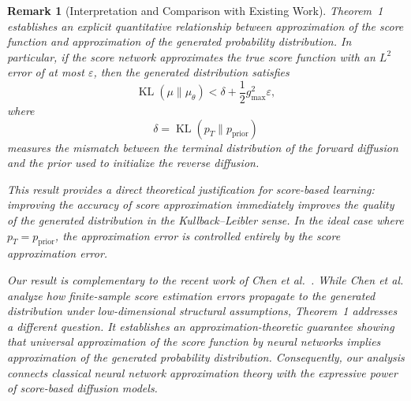 \documentclass[11pt]{article}
\newtheorem{remark}{Remark}
\DeclareMathOperator{\KL}{KL}
\begin{document}
\begin{remark}[Interpretation and Comparison with Existing Work]

Theorem~1 establishes an explicit quantitative relationship between
approximation of the score function and approximation of the generated
probability distribution. In particular, if the score network
approximates the true score function with an $L^2$ error of at most
$\varepsilon$, then the generated distribution satisfies
\[
\KL(\mu\|\mu_\theta)
<
\delta
+
\frac12 g_{\max}^2\varepsilon,
\]
where
\[
\delta=\KL(p_T\|p_{\mathrm{prior}})
\]
measures the mismatch between the terminal distribution of the forward
diffusion and the prior used to initialize the reverse diffusion.

This result provides a direct theoretical justification for score-based
learning: improving the accuracy of score approximation immediately
improves the quality of the generated distribution in the
Kullback--Leibler sense. In the ideal case where
$p_T=p_{\mathrm{prior}}$, the approximation error is controlled entirely
by the score approximation error.

Our result is complementary to the recent work of Chen et
al.~\cite{Chen2023ScoreAE}. While Chen et al. analyze how finite-sample
score estimation errors propagate to the generated distribution under
low-dimensional structural assumptions, Theorem~1 addresses a different
question. It establishes an approximation-theoretic guarantee showing
that universal approximation of the score function by neural networks
implies approximation of the generated probability distribution.
Consequently, our analysis connects classical neural network
approximation theory with the expressive power of score-based diffusion
models.
\end{remark}
\end{document}
